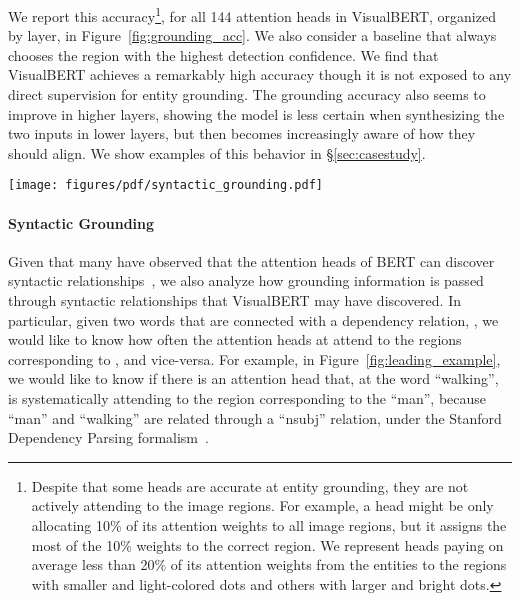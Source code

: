 \documentclass{article} \usepackage{iclr2019_conference,times}
\newcommand{\model}{VisualBERT\xspace}
\begin{document}
We report this accuracy\footnote{Despite that some heads are accurate at entity grounding, they are not actively attending to the image regions. For example, a head might be only allocating 10\% of its attention weights to all image regions, but it assigns the most of the 10\% weights to the correct region. We represent heads paying on average less than 20\% of its attention weights from the entities to the regions with smaller and light-colored dots and others with larger and bright dots.}, for all 144 attention heads in \model, organized by layer, in Figure~\ref{fig:grounding_acc}. We also consider a baseline that always chooses the region with the highest detection confidence. We find that \model achieves a remarkably high accuracy though it is not exposed to any direct supervision for entity grounding. The grounding accuracy also seems to improve in higher layers, showing the model is less certain when synthesizing the two inputs in lower layers, but then becomes increasingly aware of how they should align. We show examples of this behavior in \S \ref{sec:casestudy}.

\begin{figure*} [t]
\centering
\texttt{[image: figures/pdf/syntactic\_grounding.pdf]}
\caption{Accuracy of attention heads of \model for predicting four specific dependency relationships (``pobj'', ``amod'', ``nsubj'', and ``dobj'') across modality. The grey lines denote a baseline that always chooses the region with the highest detection confidence. We observe that \model is capable of detecting these dependency relationships without direct supervision.}
\label{fig:syntactic}
\end{figure*}

\paragraph{Syntactic Grounding}
Given that many have observed that the attention heads of BERT can discover syntactic relationships~\citep{voita2019analyzing, clark2019does}, we also analyze how grounding information is passed through syntactic relationships that \model may have discovered. In particular, given two words that are connected with a dependency relation, , we would like to know how often the attention heads at  attend to the regions corresponding to , and vice-versa. For example, in Figure~\ref{fig:leading_example}, we would like to know if there is an attention head that, at the word ``walking'', is systematically attending to the region corresponding to the ``man'', because ``man'' and ``walking'' are related through a ``nsubj'' relation, under the Stanford Dependency Parsing formalism~\citep{de2008stanford}.
\end{document}
